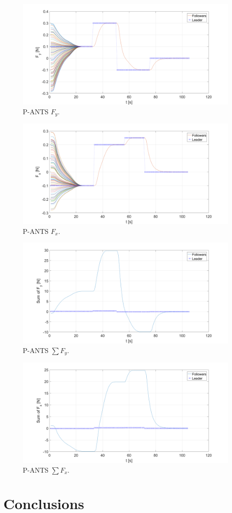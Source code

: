 \documentclass[letterpaper, 10 pt, conference]{ieeeconf}
\begin{document}
\begin{figure}[!h]
	\includegraphics[width=.53\textwidth]{figures/P_ANTS_Fy.png}
	\centering
	\caption{P-ANTS $F_y$.}
	\label{fpfy}
\end{figure}
\begin{figure}[!h]
	\includegraphics[width=.53\textwidth]{figures/P_ANTS_Fx.png}
	\centering
	\caption{P-ANTS $F_x$.}
	\label{fpfx}
\end{figure}
\begin{figure}[!h]
	\includegraphics[width=.53\textwidth]{figures/P_ANTS_SumFy.png}
	\centering
	\caption{P-ANTS $\sum F_y$.}
	\label{fpsfy}
\end{figure}
\begin{figure}[!h]
	\includegraphics[width=.53\textwidth]{figures/P_ANTS_SumFx.png}
	\centering
	\caption{P-ANTS $\sum F_x$.}
	\label{fpsfx}
\end{figure}



\section{Conclusions}\label{concl}



\end{document}
